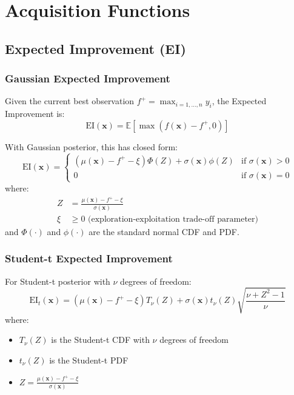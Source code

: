 \documentclass[11pt,a4paper]{article}
\begin{document}
\section{Acquisition Functions}

\subsection{Expected Improvement (EI)}

\subsubsection{Gaussian Expected Improvement}

Given the current best observation $f^+ = \max_{i=1,\ldots,n} y_i$, the Expected Improvement is:
\begin{equation}
    \text{EI}(\mathbf{x}) = \mathbb{E}[\max(f(\mathbf{x}) - f^+, 0)]
\end{equation}

With Gaussian posterior, this has closed form:
\begin{equation}
    \text{EI}(\mathbf{x}) = 
    \begin{cases}
        (\mu(\mathbf{x}) - f^+ - \xi) \Phi(Z) + \sigma(\mathbf{x}) \phi(Z) & \text{if } \sigma(\mathbf{x}) > 0 \\
        0 & \text{if } \sigma(\mathbf{x}) = 0
    \end{cases}
\end{equation}
where:
\begin{align}
    Z &= \frac{\mu(\mathbf{x}) - f^+ - \xi}{\sigma(\mathbf{x})} \\
    \xi &\geq 0 \text{ (exploration-exploitation trade-off parameter)}
\end{align}
and $\Phi(\cdot)$ and $\phi(\cdot)$ are the standard normal CDF and PDF.

\subsubsection{Student-t Expected Improvement}

For Student-t posterior with $\nu$ degrees of freedom:
\begin{equation}
    \text{EI}_t(\mathbf{x}) = (\mu(\mathbf{x}) - f^+ - \xi) T_\nu(Z) + \sigma(\mathbf{x}) t_\nu(Z) \sqrt{\frac{\nu + Z^2 - 1}{\nu}}
\end{equation}
where:
\begin{itemize}
    \item $T_\nu(Z)$ is the Student-t CDF with $\nu$ degrees of freedom
    \item $t_\nu(Z)$ is the Student-t PDF
    \item $Z = \frac{\mu(\mathbf{x}) - f^+ - \xi}{\sigma(\mathbf{x})}$
\end{itemize}
\end{document}
